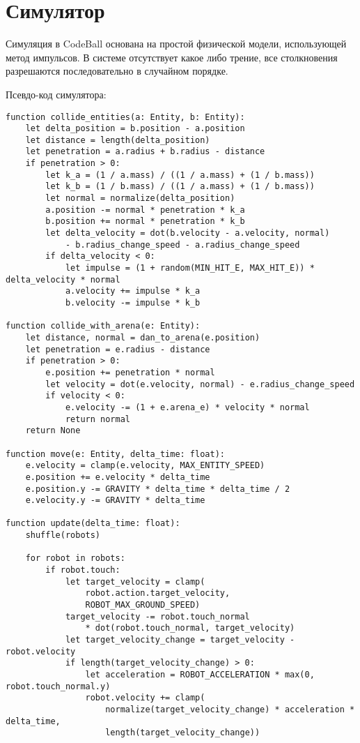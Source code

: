 \chapter{Симулятор}

Симуляция в CodeBall основана на простой физической модели, использующей метод импульсов.
В системе отсутствует какое либо трение, все столкновения разрешаются последовательно в случайном порядке.

Псевдо-код симулятора:

\begin{verbatim}
function collide_entities(a: Entity, b: Entity):
    let delta_position = b.position - a.position
    let distance = length(delta_position)
    let penetration = a.radius + b.radius - distance
    if penetration > 0:
        let k_a = (1 / a.mass) / ((1 / a.mass) + (1 / b.mass))
        let k_b = (1 / b.mass) / ((1 / a.mass) + (1 / b.mass))
        let normal = normalize(delta_position)
        a.position -= normal * penetration * k_a
        b.position += normal * penetration * k_b
        let delta_velocity = dot(b.velocity - a.velocity, normal)
            - b.radius_change_speed - a.radius_change_speed
        if delta_velocity < 0:
            let impulse = (1 + random(MIN_HIT_E, MAX_HIT_E)) * delta_velocity * normal
            a.velocity += impulse * k_a
            b.velocity -= impulse * k_b

function collide_with_arena(e: Entity):
    let distance, normal = dan_to_arena(e.position)
    let penetration = e.radius - distance
    if penetration > 0:
        e.position += penetration * normal
        let velocity = dot(e.velocity, normal) - e.radius_change_speed
        if velocity < 0:
            e.velocity -= (1 + e.arena_e) * velocity * normal
            return normal
    return None

function move(e: Entity, delta_time: float):
    e.velocity = clamp(e.velocity, MAX_ENTITY_SPEED)
    e.position += e.velocity * delta_time
    e.position.y -= GRAVITY * delta_time * delta_time / 2
    e.velocity.y -= GRAVITY * delta_time

function update(delta_time: float):
    shuffle(robots)

    for robot in robots:
        if robot.touch:
            let target_velocity = clamp(
                robot.action.target_velocity,
                ROBOT_MAX_GROUND_SPEED)
            target_velocity -= robot.touch_normal
                * dot(robot.touch_normal, target_velocity)
            let target_velocity_change = target_velocity - robot.velocity
            if length(target_velocity_change) > 0:
                let acceleration = ROBOT_ACCELERATION * max(0, robot.touch_normal.y)
                robot.velocity += clamp(
                    normalize(target_velocity_change) * acceleration * delta_time,
                    length(target_velocity_change))


\end{verbatim}
